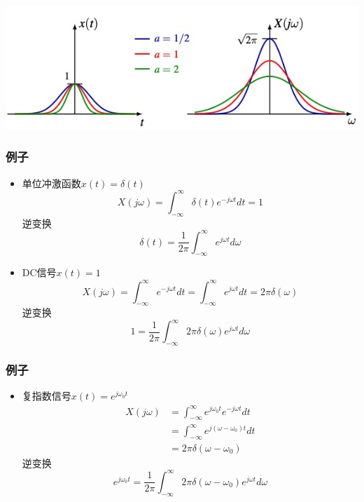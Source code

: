 \documentclass[CJKutf8,xcolor=pdftex,dvipsnames,table]{beamer}
\begin{document}
\begin{CJK*}{UTF8}{song}
\begin{frame}
\begin{itemize}
    	\begin{center}
      	\includegraphics[scale=.5]{ftgaussian}
    	\end{center}
    \end{itemize}

  \end{frame} 
       
  \begin{frame}
    \frametitle{例子}
    \begin{itemize}
    \item 单位冲激函数$x(t) = \delta(t)$
    \[
    	X(j\omega) = \int_{-\infty}^{\infty}\delta(t)e^{-j\omega t}dt = 1
    \]
    逆变换
    \[
    	\delta(t) = \frac{1}{2\pi}\int_{-\infty}^{\infty}e^{j\omega t}d\omega
    \]
    \item DC信号$x(t)=1$    
    \[
    	X(j\omega) = \int_{-\infty}^{\infty}e^{-j\omega t}dt = \int_{-\infty}^{\infty}e^{j\omega t}dt = 2\pi\delta(\omega)
    \]
    逆变换
    \[
    	1 = \frac{1}{2\pi}\int_{-\infty}^{\infty}2\pi\delta(\omega)e^{j\omega t}d\omega
    \]
    \end{itemize}

  \end{frame} 

  \begin{frame}
    \frametitle{例子}
    \begin{itemize}    
    \item 复指数信号$x(t)=e^{j\omega_0 t}$
        \begin{align*}
 		X(j\omega) & = \int_{-\infty}^{\infty}e^{j\omega_0 t}e^{-j\omega t}dt \\
		& = \int_{-\infty}^{\infty}e^{j(\omega-\omega_0) t}dt    \\
		& = 2\pi\delta(\omega-\omega_0)
    	\end{align*} 
	逆变换
    \[
    	e^{j\omega_0 t} = \frac{1}{2\pi}\int_{-\infty}^{\infty}2\pi\delta(\omega-\omega_0)e^{j\omega t}d\omega
    \]

    \end{itemize}


\end{frame}
\end{CJK*}
\end{document}

